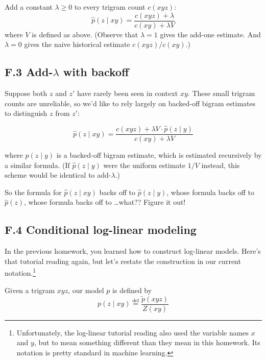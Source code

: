\documentclass[12pt]{article}
\theoremstyle{plain}
\theoremstyle{definition}
\theoremstyle{remark}
\begin{document}
Add a constant $\lambda \geq 0$ to every trigram count $c(xyz)$:  
\begin{equation}
\hat{p}(z \mid xy) = \frac{c(xyz)+\lambda}{c(xy)+\lambda V}
\end{equation}  
where $V$ is defined as above. (Observe that $\lambda=1$ gives the add-one estimate. And $\lambda=0$ gives the naive 
historical estimate $c(xyz)/c(xy)$.)  

\subsection*{F.3 \quad Add-$\lambda$ with backoff}

Suppose both $z$ and $z'$ have rarely been seen in context $xy$. These small trigram counts are unreliable, so 
we’d like to rely largely on backed-off bigram estimates to distinguish $z$ from $z'$:  

\begin{equation}
\hat{p}(z \mid xy) = \frac{c(xyz)+\lambda V \cdot \hat{p}(z \mid y)}{c(xy)+\lambda V}
\end{equation}  

where $\hat{p}(z \mid y)$ is a backed-off bigram estimate, which is estimated recursively by a similar formula. (If 
$\hat{p}(z \mid y)$ were the uniform estimate $1/V$ instead, this scheme would be identical to add-$\lambda$.)  

So the formula for $\hat{p}(z \mid xy)$ backs off to $\hat{p}(z \mid y)$, whose formula backs off to $\hat{p}(z)$, whose formula 
backs off to \dots what?? Figure it out!  

\subsection*{F.4 \quad Conditional log-linear modeling}

In the previous homework, you learned how to construct log-linear models. Here’s that tutorial reading 
again, but let’s restate the construction in our current notation.\footnote{Unfortunately, the log-linear tutorial reading also used the variable names $x$ and $y$, but to mean something different than they mean in this homework. Its notation is pretty standard in machine learning.}  

Given a trigram $xyz$, our model $p$ is defined by  
\begin{equation}
p(z \mid xy) \overset{\text{def}}{=} \frac{\tilde{p}(xyz)}{Z(xy)}
\end{equation}  
\end{document}
